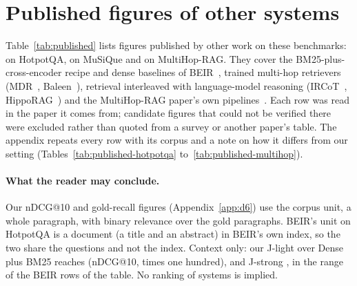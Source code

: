 \section{Published figures of other systems}
\label{sec:published}

Table~\ref{tab:published} lists \nPublishedRows{} figures published by other work on these
benchmarks: \nPublishedHotpotqa{} on HotpotQA, \nPublishedMusique{} on MuSiQue and \nPublishedMultihop{}
on MultiHop-RAG. They cover the BM25-plus-cross-encoder recipe and dense baselines of
BEIR~\citep{thakur2021beir}, trained multi-hop retrievers
(MDR~\citep{xiong2021mdr}, Baleen~\citep{khattab2021baleen}), retrieval interleaved with
language-model reasoning (IRCoT~\citep{trivedi2023ircot}, HippoRAG~\citep{gutierrez2024hipporag,gutierrez2025hipporag2})
and the MultiHop-RAG paper's own pipelines~\citep{tang2024multihoprag}. Each row was read in the
paper it comes from; \nPublishedExcluded{} candidate figures that could not be verified there were
excluded rather than quoted from a survey or another paper's table. The appendix repeats every row with its
corpus and a note on how it differs from our setting (Tables~\ref{tab:published-hotpotqa}
to~\ref{tab:published-multihop}).

\begin{table}[!t]
\centering
\scriptsize
\setlength{\tabcolsep}{3pt}
\caption{\capPublishedShort}
\label{tab:published}

\end{table}

\paragraph{What the reader may conclude.} Our nDCG@10 and gold-recall figures
(Appendix~\ref{app:d6}) use the corpus unit, a whole paragraph, with binary relevance over the gold
paragraphs. BEIR's unit on HotpotQA is a document (a title and an abstract) in BEIR's own index, so the
two share the questions and not the index. Context only: our J-light over Dense plus BM25 reaches
\ndcgLightPTenBHotpot{} (nDCG@10, times one hundred), and J-strong \ndcgStrongPTenBHotpot{}, in the range of
the BEIR rows of the table. No ranking of systems is implied.

